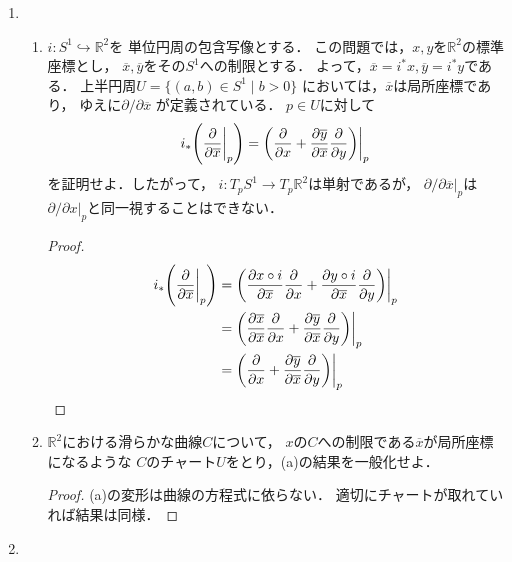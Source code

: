 \documentclass[dvipdfmx,a4paper,11pt]{jsarticle}
\begin{document}
\begin{enumerate}
\begin{proof}
    となる．\\
    $T_p S^n$と$\sum_{i=1}^{n+1}a^ip^i=0$を満たす
    $T_p\mathbb{R}^{n+1}$の部分集合はどちらも同じ次元をもつ
    ベクトル空間で，上述の議論から前者は後者に含まれるため，同型である．
  \end{proof}
  \item{}\\
  \begin{enumerate}
    \item $i\colon S^1\hookrightarrow\mathbb{R}^2$を
    単位円周の包含写像とする．
    この問題では，$x,y$を$\mathbb{R}^2$の標準座標とし，
    $\overline{x},\overline{y}$をその$S^1$への制限とする．
    よって，$\overline{x}=i^*x,\overline{y}=i^*y$である．
    上半円周$U=\{(a,b)\in S^1\mid b>0\}$
    においては，$\overline{x}$は局所座標であり，
    ゆえに$\partial/\partial \overline{x}$
    が定義されている．
    $p\in U$に対して\begin{align}
      i_*\qty(\pdv{}{\overline{x}}\bigg|_{p})
      =\qty(\pdv{}{x}+\pdv{\overline{y}}{\overline{x}}
      \pdv{}{y})\bigg|_p
    \end{align}
    を証明せよ．したがって，
    $i\colon T_p S^1\to T_p\mathbb{R}^2$は単射であるが，
    $\partial/\partial \overline{x}|_p$は
    $\partial/\partial x|_p$と同一視することはできない．
    \begin{proof}
      \begin{align}
        i_*\qty(\pdv{}{\overline{x}}\bigg|_{p})
        &=\qty(\pdv{x\circ i}{\overline{x}}\pdv{}{x}
        +\pdv{y\circ i}{\overline{x}}\pdv{}{y})\bigg|_p\\
        &=\qty(\pdv{\overline{x}}{\overline{x}}\pdv{}{x}
        +\pdv{\overline{y}}{\overline{x}}\pdv{}{y})
        \bigg|_p\\
        &=\qty(\pdv{}{x}
        +\pdv{\overline{y}}{\overline{x}}\pdv{}{y})
        \bigg|_p
      \end{align}
    \end{proof}
    \item $\mathbb{R}^2$における滑らかな曲線$C$について，
    $x$の$C$への制限である$\overline{x}$が局所座標になるような
    $C$のチャート$U$をとり，(a)の結果を一般化せよ．
    \begin{proof}
      (a)の変形は曲線の方程式に依らない．
      適切にチャートが取れていれば結果は同様．
    \end{proof}
  \end{enumerate}
  \item {}\\

\end{enumerate}
\end{document}

